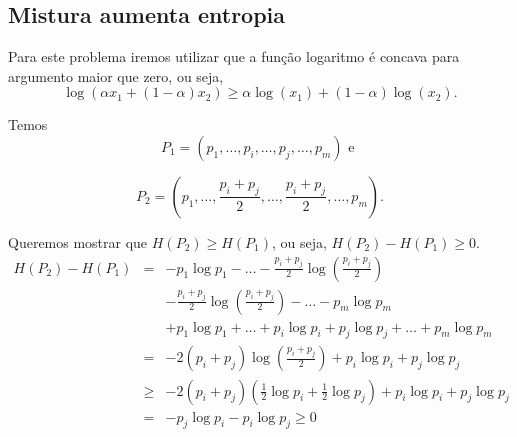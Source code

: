 \subsection{Mistura aumenta entropia}

\begin{questions}

\begin{solution}

  Para este problema iremos utilizar que a função logaritmo é concava para argumento maior que zero, ou seja,
  \begin{equation}
  \log(\alpha x_1 + (1-\alpha) x_2) \geq \alpha \log(x_1) + (1 - \alpha) \log(x_2) .
  \end{equation}

  Temos 
  \begin{equation}
  P_1 = (p_1, \ldots, p_i, \ldots, p_j, \ldots, p_m) \text { e }
  \end{equation}

  \begin{equation}
  P_2 = (p_1, \ldots, \frac{p_i+p_j}{2}, \ldots, \frac{p_i+p_j}{2}, \ldots, p_m) .
  \end{equation}

  Queremos mostrar que $H(P_2) \geq H(P_1)$, ou seja, $H(P_2) - H(P_1) \geq 0$.
  \begin{eqnarray}
  H(P_2) - H(P_1) &=& - p_1 \log p_1 - \ldots - \frac{p_i+p_j}{2} \log \left( \frac{p_i+p_j}{2} \right) \nonumber \\
                   && - \frac{p_i+p_j}{2} \log \left( \frac{p_i+p_j}{2} \right) - \ldots - p_m \log p_m \nonumber \\
                && + p_1 \log p_1 + \ldots + p_i \log p_i + p_j \log p_j + \ldots + p_m \log p_m \nonumber \\
                &=& - 2 (p_i + p_j) \log \left( \frac{p_i+p_j}{2} \right) + p_i \log p_i + p_j \log p_j \nonumber \\
                &\geq& - 2 (p_i + p_j) \left( \frac{1}{2} \log p_i + \frac{1}{2} \log p_j \right) + p_i \log p_i + p_j \log p_j \nonumber \\
                &=& -p_j \log p_i - p_i \log p_j \geq 0
  \end{eqnarray}

\end{solution}
\end{questions}
